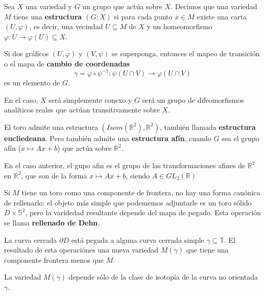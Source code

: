 \documentclass[12pt]{report}
\theoremstyle{largebreak}
\newcommand\cf[3]{\ensuremath{#1:#2\rightarrow#3}}
\begin{document}
    \begin{mydef}
        Sea $X$ una variedad y $G$ un grupo que actúa sobre $X$. Decimos que una variedad $M$ tiene una \textbf{estructura $(G;X)$} si para cada punto $x\in M$ existe una carta $(U,\varphi)$, es decir, una vecindad $U\subseteq M$ de $X$ y un homeomorfismo $\cf{\varphi}{U}{\varphi(U)\subseteq X}$.

        Si dos gráficos $(U,\varphi)$ y $(V,\psi)$ se superponga, entonces el mapeo de transición o el mapa de \textbf{cambio de coordenadas}
        \begin{equation*}
            \cf{\gamma=\varphi\circ\psi^{-1}}{\psi(U\cap V)}{\varphi(U\cap V)}
        \end{equation*}
        es un elemento de $G$.
    \end{mydef}

    \begin{obs}
        En el caso, $X$ será simplemente conexo y $G$ será un grupo de difeomorfismos analíticos reales que actúan transitivamente sobre $X$.
    \end{obs}

    \begin{exa}
        El toro admite una estructura $(Isom(\mathbb{R}^2),\mathbb{R}^2)$, también llamada \textbf{estructura eucliedeana}. Pero también admite una \textbf{estructura afín}, cuando $G$ sea el grupo afín ($x\mapsto Ax+b$) que actúa sobre $\mathbb{R}^2$.

        En el caso anterior, el gupo afin es el grupo de las transformaciones afines de $\mathbb{R}^2$ en $\mathbb{R}^2$, que son de la forma $x\mapsto Ax+b$, siendo $A\in GL_2(\mathbb{R})$
    \end{exa}

    Si $M$ tiene un toro como una componente de frontera, no hay una forma canónica de rellenarlo: el objeto más simple que podememos adjuntarle es un toro sólido $D\times\mathbb{S}^2$, pero la varidedad resultante depende del mapa de pegado. Esta operación se llama \textbf{rellenado de Dehn}.

    La curva cerrada $\partial D$ está pegada a alguna curva cerrada simple $\gamma\subseteq \mathbb{T}$. El resultado de esta operaciónes una nueva variedad $M(\gamma)$ que tiene una componente frontera menos que $M$.

    \begin{lema}
        La variedad $M(\gamma)$ depende sólo de la clase de isotopía de la curva no orientada $\gamma$.
    \end{lema}
\end{document}
